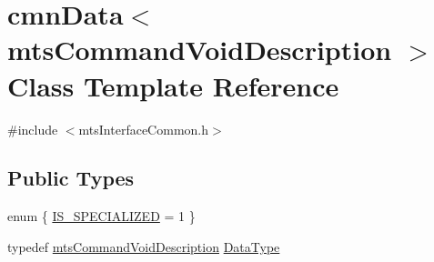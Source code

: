 \hypertarget{classcmn_data_3_01mts_command_void_description_01_4}{}\section{cmn\+Data$<$ mts\+Command\+Void\+Description $>$ Class Template Reference}
\label{classcmn_data_3_01mts_command_void_description_01_4}


{\ttfamily \#include $<$mts\+Interface\+Common.\+h$>$}

\subsection*{Public Types}
\begin{DoxyCompactItemize}
\item 
enum \{ \hyperlink{classcmn_data_3_01mts_command_void_description_01_4_a3f5385c0e470876d1a86ffcb8c5a23b1a6179e63fede915ad2b315314584f25f0}{I\+S\+\_\+\+S\+P\+E\+C\+I\+A\+L\+I\+Z\+E\+D} = 1
 \}
\item 
typedef \hyperlink{classmts_command_void_description}{mts\+Command\+Void\+Description} \hyperlink{classcmn_data_3_01mts_command_void_description_01_4_a3e577a0f1b624d67c004609f2145eba4}{Data\+Type}
\end{DoxyCompactItemize}
